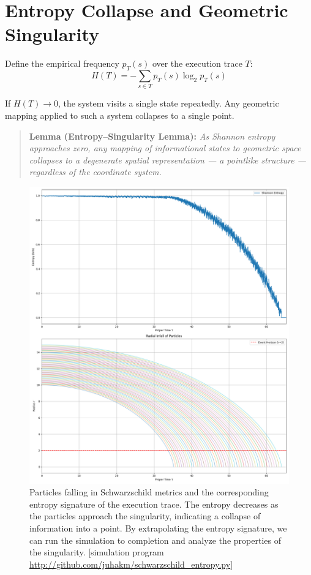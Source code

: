 \documentclass[11pt]{article}
\begin{document}
\section{Entropy Collapse and Geometric Singularity}

Define the empirical frequency $p_T(s)$ over the execution trace $T$:
\[
  H(T) = -\sum_{s \in T} p_T(s) \log_2 p_T(s)
\]

If $H(T) \to 0$, the system visits a single state repeatedly. Any geometric mapping applied to such a system collapses to a single point.

\begin{quote}
  \textbf{Lemma (Entropy--Singularity Lemma):}
  \emph{As Shannon entropy approaches zero, any mapping of informational states to geometric space collapses to a degenerate spatial representation — a pointlike structure — regardless of the coordinate system.}
\end{quote}


\begin{figure}[h!]
  \centering
  \includegraphics[width=1.0\textwidth]{figures/schwarzschild_entropy_signature.png}
  \caption{Particles falling in Schwarzschild metrics and the corresponding entropy signature of the execution trace. The entropy decreases as the particles approach the singularity, indicating a collapse of information into a point. By extrapolating the entropy signature, we can run the simulation to completion and analyze the properties of the singularity.
      [simulation program \url{http://github.com/juhakm/schwarzschild_entropy.py}]}
  \label{fig:vanishing_entropy}
\end{figure}
\end{document}
